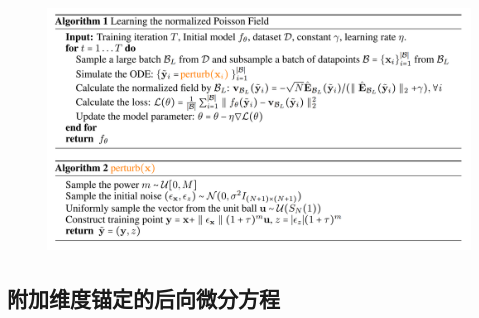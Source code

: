\documentclass[hyperref,UTF-8]{ctexart}
\newcommand{\0}{\boldsymbol{0}}
\begin{document}
\begin{figure}[ht]
  \centering
  \includegraphics[width=1\textwidth]{img/algorithm.png}
\end{figure}

\subsection{附加维度锚定的后向微分方程}
\end{document}
